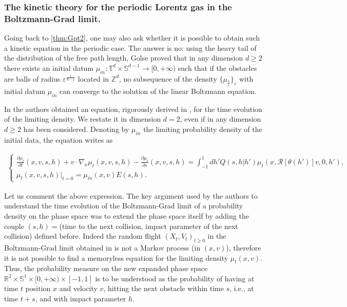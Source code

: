 \documentclass[a4paper,10pt,reqno]{amsart}
\numberwithin{equation}{subsection}
\numberwithin{figure}{subsection}
\begin{document}
\subsubsection{The kinetic theory for the periodic Lorentz gas in the Boltzmann-Grad limit.} Going back to \eqref{thm:Gpt2}, one may also ask whether it is possible to obtain such a kinetic equation in the periodic case. The answer is no: using the heavy tail of the distribution of the free path length, Golse \cite{Golse2008} proved that in any dimension $d\geq2$ there exists an initial datum $\mu_{in}:\mathbb{T}^d\times\mathbb{S}^{d-1}\to[0,+\infty)$ such that if the obstacles are balls of radius $\varepsilon^{\frac{1}{d-1}}$ located in $\mathbb{Z}^d$, no subsequence of the density $\{\mu_{\frac{t}{\varepsilon}}\}_{\varepsilon}$ with initial datum $\mu_{in}$ can converge to the solution of the linear Boltzmann equation.

In \cite{CG2008,CG2010} the authors obtained an equation, rigorously derived in \cite{MS2008bgl}, for the time evolution of the limiting density. We restate it in dimension $d=2$, even if in \cite{MS2008bgl} any dimension $d\geq2$ has been considered. Denoting by $\mu_{in}$ the limiting probability density of the initial data, the equation writes as

{\footnotesize\begin{align}\label{evoluzionetemp}
\left\{\begin{array}{lcr}\frac{\partial\mu_t}{\partial t}(x,v,s,h)+v\cdot\nabla_x\mu_t(x,v,s,h)-\frac{\partial\mu_t}{\partial s}(x,v,s,h)=\int_{-1}^1dh'Q(s,h|h')\mu_t(x,{\mathcal R}[\theta(h')]v,0,h'),\\\mu_t(x,v,s,h)|_{t=0}=\mu_{in}(x,v)E(s,h).\end{array}\right.
\end{align}}

Let us comment the above expression. The key argument used by the authors to understand the time evolution of the Boltzmann-Grad limit of a probability density on the phase space was to extend the phase space itself by adding the couple $(s,h)=$(time to the next collision, impact parameter of the next collision) defined before. Indeed the random flight $(X_t,V_t)_{t\geq0}$ in the Boltzmann-Grad limit obtained in \cite{MS2008bgl} is not a Markov process (in $(x,v)$), therefore it is not possible to find a memoryless equation for the limiting density $\mu_t(x,v)$. Thus, the probability measure on the new expanded phase space $\mathbb{R}^2\times\mathbb{S}^1\times[0,+\infty)\times[-1,1]$ is to be understood as the probability of having at time $t$ position $x$ and velocity $v$, hitting the next obstacle within time $s$, i.e., at time $t+s$, and with impact parameter $h$.
\end{document}
